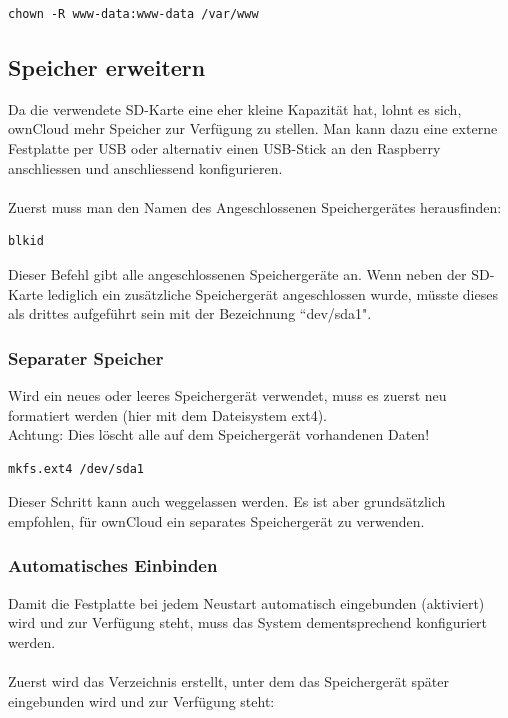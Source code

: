 \begin{lstlisting}
chown -R www-data:www-data /var/www
\end{lstlisting}

\subsection{Speicher erweitern}
Da die verwendete SD-Karte eine eher kleine Kapazität hat, lohnt es sich, ownCloud mehr Speicher zur Verfügung zu stellen. Man kann dazu eine externe Festplatte per USB oder alternativ einen USB-Stick an den Raspberry anschliessen und anschliessend konfigurieren.
\\
\\
Zuerst muss man den Namen des Angeschlossenen Speichergerätes herausfinden: 

\begin{lstlisting}
blkid
\end{lstlisting}

Dieser Befehl gibt alle angeschlossenen Speichergeräte an. Wenn neben der SD-Karte lediglich ein zusätzliche Speichergerät angeschlossen wurde, müsste dieses als drittes aufgeführt sein mit der Bezeichnung ``dev/sda1".

\subsubsection{Separater Speicher}
Wird ein neues oder leeres Speichergerät verwendet, muss es zuerst neu formatiert werden (hier mit dem Dateisystem ext4).
\\Achtung: Dies löscht alle auf dem Speichergerät vorhandenen Daten!
\\
\begin{lstlisting}
mkfs.ext4 /dev/sda1
\end{lstlisting}

Dieser Schritt kann auch weggelassen werden. Es ist aber grundsätzlich empfohlen, für ownCloud ein separates Speichergerät zu verwenden.

\subsubsection{Automatisches Einbinden}
Damit die Festplatte bei jedem Neustart automatisch eingebunden (aktiviert) wird und zur Verfügung steht, muss das System dementsprechend konfiguriert werden. 
\\
\\
Zuerst wird das Verzeichnis erstellt, unter dem das Speichergerät später eingebunden wird und zur Verfügung steht:

